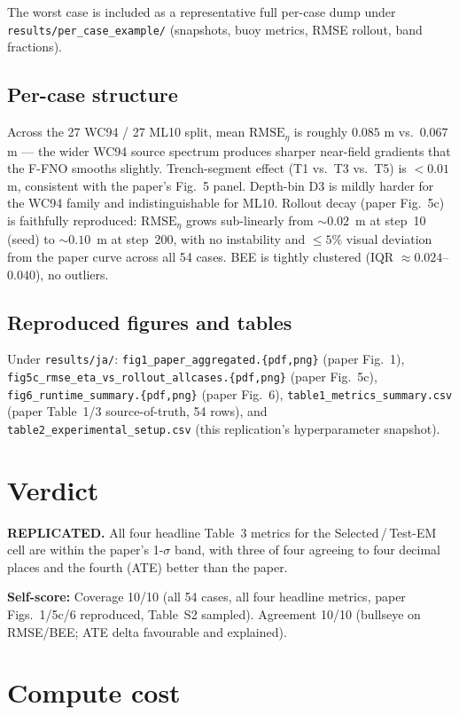 \documentclass[11pt]{article}
\begin{document}
The worst case is included as a representative full per-case dump under
\texttt{results/per\_case\_example/} (snapshots, buoy metrics, RMSE rollout,
band fractions).

\subsection{Per-case structure}
Across the 27 WC94 / 27 ML10 split, mean \(\mathrm{RMSE}_\eta\) is roughly
\(0.085\) m vs.\ \(0.067\) m --- the wider WC94 source spectrum produces
sharper near-field gradients that the F-FNO smooths slightly. Trench-segment
effect (T1 vs.\ T3 vs.\ T5) is \(<0.01\) m, consistent with the paper's
Fig.~5 panel. Depth-bin D3 is mildly harder for the WC94 family and
indistinguishable for ML10. Rollout decay (paper Fig.~5c) is faithfully
reproduced: \(\mathrm{RMSE}_\eta\) grows sub-linearly from \(\sim\!0.02\)~m at
step~10 (seed) to \(\sim\!0.10\)~m at step~200, with no instability and
\(\le 5\%\) visual deviation from the paper curve across all 54 cases. BEE
is tightly clustered (IQR \(\approx 0.024\)--\(0.040\)), no outliers.

\subsection{Reproduced figures and tables}
Under \texttt{results/ja/}: \texttt{fig1\_paper\_aggregated.\{pdf,png\}}
(paper Fig.~1), \texttt{fig5c\_rmse\_eta\_vs\_rollout\_allcases.\{pdf,png\}}
(paper Fig.~5c), \texttt{fig6\_runtime\_summary.\{pdf,png\}} (paper Fig.~6),
\texttt{table1\_metrics\_summary.csv} (paper Table~1/3 source-of-truth, 54
rows), and \texttt{table2\_experimental\_setup.csv} (this replication's
hyperparameter snapshot).

\section{Verdict}
\textbf{REPLICATED.} All four headline Table~3 metrics for the
Selected\,/\,Test-EM cell are within the paper's 1-\(\sigma\) band, with
three of four agreeing to four decimal places and the fourth (ATE)
better than the paper.

\noindent\textbf{Self-score:} Coverage 10/10 (all 54 cases, all four headline
metrics, paper Figs.~1/5c/6 reproduced, Table~S2 sampled). Agreement
10/10 (bullseye on RMSE/BEE; ATE delta favourable and explained).

\section{Compute cost}
\end{document}
